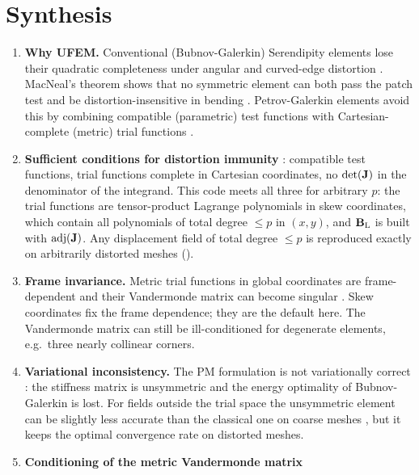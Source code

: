 \section{Synthesis}

\begin{enumerate}
  \item \textbf{Why UFEM.} Conventional (Bubnov-Galerkin) Serendipity elements lose
    their quadratic completeness under angular and curved-edge distortion
    \parencite{Lee1993effects}. MacNeal's theorem shows that no symmetric element
    can both pass the patch test and be distortion-insensitive in bending
    \parencite{MacNeal1992On}. Petrov-Galerkin elements avoid this by combining
    compatible (parametric) test functions with Cartesian-complete (metric) trial
    functions \parencite{Rajendran2003novel,Rajendran2010technique}.
  \item \textbf{Sufficient conditions for distortion immunity}
    \parencite{Rajendran2010technique}: compatible test functions, trial functions
    complete in Cartesian coordinates, no $\det(\mathbf{J})$ in the denominator of the
    integrand. This code meets all three for arbitrary $p$: the trial functions are
    tensor-product Lagrange polynomials in skew coordinates, which contain all
    polynomials of total degree $\le p$ in $(x, y)$, and $\mathbf{B}_\mathrm{L}$ is built with
    $\operatorname{adj}(\mathbf{J})$. Any displacement field of total degree $\le p$ is reproduced
    exactly on arbitrarily distorted meshes ().
  \item \textbf{Frame invariance.} Metric trial functions in global coordinates are
    frame-dependent and their Vandermonde matrix can become singular
    \parencite{Ooi2008Remedies}. Skew coordinates
    \parencite{Yuan1993New,Xie2016Modified} fix the frame dependence; they are the
    default here. The Vandermonde matrix can still be ill-conditioned for
    degenerate elements, e.g.\ three nearly collinear corners.
  \item \textbf{Variational inconsistency.} The PM formulation is not variationally
    correct \parencite{Prathap2007The}: the stiffness matrix is unsymmetric and the
    energy optimality of Bubnov-Galerkin is lost. For fields outside the trial
    space the unsymmetric element can be slightly less accurate than the classical
    one on coarse meshes \parencite{Zaehringer2024finite}, but it keeps the optimal
    convergence rate on distorted meshes.
  \item \textbf{Conditioning of the metric Vandermonde matrix}

\end{enumerate}
